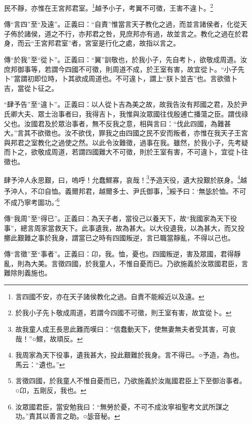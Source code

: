 民不靜，亦惟在王宮邦君室。\footnote{言四國不安，亦在天子諸侯教化之過。自責不能綏近以及遠。}越予小子，考翼不可徵，王害不違卜。\footnote{於我小子先卜敬成周道，若謂今四國不可徵，則王室有害，故宜從卜。}

{\noindent\zhuan{}\fzbyks 傳“言四”至“及遠”。正義曰：“自責”惟當言天子教化之過，而並言諸侯者，化從天子佈於諸侯，道之不行，亦邦君之咎，見庶邦亦有過，故並言之。教化之過在於君身，而云“王宮邦君室”者，宮室是行化之處，故指以言之。 \par}

{\noindent\zhuan{}\fzbyks 傳“於我”至“從卜”。正義曰：“翼”訓敬也，於我小子，先自考卜，欲敬成周道。汝庶邦御事等，若謂今四國不可徵，則周道不成，於王室有害，故宜從卜。“小子先卜”當謂初即位時，卜其欲成周道也。不可違卜，謂上“朕卜並吉”也。言欲徵卜吉，當從卜征之。 \par}

{\noindent\shu{}\fzkt “肆予告”至“違卜”。正義曰：以人從卜吉為美之故，故我告汝有邦國之君，及於尹氏卿大夫、眾士治事者曰，我得吉卜，我惟與汝眾國往伐殷逋亡播蕩之臣。謂伐祿父也。汝國君及於眾治事者，無不反我之意，相與言曰：“伐此四國，為難甚大。”言其不欲徵也。汝不欲伐，罪我之由四國之民不安而叛者，亦惟在我天子王宮與邦君之室教化之過使之然。以此令汝難徵，過事在我。雖然，於我小子，先考疑而卜之，欲敬成周道，若謂四國難大不可徵，則於王室有害，不可違卜，宜從卜往徵也。 \par}

肆予沖人永思艱，曰，嗚呼！允蠢鰥寡，哀哉！\footnote{故我童人成王長思此難而嘆曰：“信蠢動天下，使無妻無夫者受其害，可哀哉！”○鰥，故頑反。}予造天役，遺大投艱於朕身。\footnote{我周家為天下役事，遺我甚大，投此艱難於我身。言不得已。○予造，為也。馬云：“遺也。”}越予沖人，不卬自恤。義爾邦君，越爾多士、尹氏御事，\footnote{言徵四國，於我童人不惟自憂而已，乃欲施義於汝胤國君臣上下至御治事者。○卬，五剛反，我也。}綏予曰：‘無毖於恤。不可不成乃寧考圖功。’\footnote{汝眾國君臣，當安勉我曰：“無勞於憂，不可不成汝寧祖聖考文武所謀之功。”責其以善言之助。○毖音秘。}


{\noindent\zhuan{}\fzbyks 傳“我周”至“得已”。正義曰：為天子者，當役己以養天下，故“我國家為天下役事”，總言周家當救天下。此事遺我，故為甚大。以大役遺我，以為甚大，而又投擲此艱難之事於我身，謂當已之時有四國叛逆，言已職當靜亂，不得以己也。 \par}

{\noindent\zhuan{}\fzbyks 傳“言徵”至“事者”。正義曰：卬，我。恤，憂也。四國叛逆，害及眾國，君得靜亂，則為大美。言徵四國，於我童人，不惟自憂而已。乃欲施義於汝眾國君臣，言難除則義施也。 \par}

